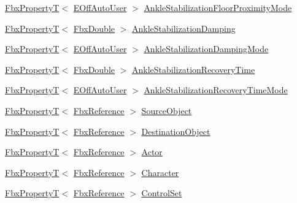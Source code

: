 \begin{DoxyCompactItemize}
\item 
\hyperlink{class_fbx_property_t}{Fbx\+PropertyT}$<$ \hyperlink{class_fbx_character_ab698a180e6f900ba8317257749c2ecce}{E\+Off\+Auto\+User} $>$ \hyperlink{class_fbx_character_a57748d04f64d5abb209b202c4fe49726}{Ankle\+Stabilization\+Floor\+Proximity\+Mode}
\item 
\hyperlink{class_fbx_property_t}{Fbx\+PropertyT}$<$ \hyperlink{fbxtypes_8h_a171e72a1c46fc15c1a6c9c31948c1c5b}{Fbx\+Double} $>$ \hyperlink{class_fbx_character_afe32df055c5f04d1c327e42e301ffdbb}{Ankle\+Stabilization\+Damping}
\item 
\hyperlink{class_fbx_property_t}{Fbx\+PropertyT}$<$ \hyperlink{class_fbx_character_ab698a180e6f900ba8317257749c2ecce}{E\+Off\+Auto\+User} $>$ \hyperlink{class_fbx_character_aea0449cedae7259bd1e9afd213fcdf4b}{Ankle\+Stabilization\+Damping\+Mode}
\item 
\hyperlink{class_fbx_property_t}{Fbx\+PropertyT}$<$ \hyperlink{fbxtypes_8h_a171e72a1c46fc15c1a6c9c31948c1c5b}{Fbx\+Double} $>$ \hyperlink{class_fbx_character_a8eb3285bb3a9fadedc4ccef79e97dda0}{Ankle\+Stabilization\+Recovery\+Time}
\item 
\hyperlink{class_fbx_property_t}{Fbx\+PropertyT}$<$ \hyperlink{class_fbx_character_ab698a180e6f900ba8317257749c2ecce}{E\+Off\+Auto\+User} $>$ \hyperlink{class_fbx_character_a2e7887fe49c1f8dfadabff2a882a94de}{Ankle\+Stabilization\+Recovery\+Time\+Mode}
\item 
\hyperlink{class_fbx_property_t}{Fbx\+PropertyT}$<$ \hyperlink{fbxtypes_8h_a44df6a2eec915cf27cd481e5c5e48a24}{Fbx\+Reference} $>$ \hyperlink{class_fbx_character_ac795fa45cdd1130e47667fa534510050}{Source\+Object}
\item 
\hyperlink{class_fbx_property_t}{Fbx\+PropertyT}$<$ \hyperlink{fbxtypes_8h_a44df6a2eec915cf27cd481e5c5e48a24}{Fbx\+Reference} $>$ \hyperlink{class_fbx_character_a7157b8566b35af363bdacf25b912c424}{Destination\+Object}
\item 
\hyperlink{class_fbx_property_t}{Fbx\+PropertyT}$<$ \hyperlink{fbxtypes_8h_a44df6a2eec915cf27cd481e5c5e48a24}{Fbx\+Reference} $>$ \hyperlink{class_fbx_character_a2d6a6f3a0ffde11982026238a04c2a0b}{Actor}
\item 
\hyperlink{class_fbx_property_t}{Fbx\+PropertyT}$<$ \hyperlink{fbxtypes_8h_a44df6a2eec915cf27cd481e5c5e48a24}{Fbx\+Reference} $>$ \hyperlink{class_fbx_character_a983a4ad7a5845c73bfca3e5c3ba7c627}{Character}
\item 
\hyperlink{class_fbx_property_t}{Fbx\+PropertyT}$<$ \hyperlink{fbxtypes_8h_a44df6a2eec915cf27cd481e5c5e48a24}{Fbx\+Reference} $>$ \hyperlink{class_fbx_character_a63ee7beafdba6113be07c3947d83a245}{Control\+Set}

\end{DoxyCompactItemize}

